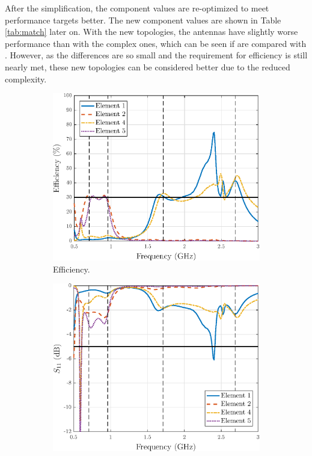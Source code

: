 After the simplification, the component values are re-optimized to meet performance targets better. The new component values are shown in Table \ref{tab:match} later on. With the new topologies, the antennas have slightly worse performance than with the complex ones, which can be seen if  are compared with . However, as the differences are so small and the requirement for efficiency is still nearly met, these new topologies can be considered better due to the reduced complexity.
\begin{figure}[H]
    \centering
    \begin{subfigure}[b]{0.49\textwidth}
        \includegraphics[width=\textwidth]{img/diversity_eff_ideal.eps}
        \caption{Efficiency.}
        \label{fig:div_eff_ideal}
    \end{subfigure}
    \begin{subfigure}[b]{0.49\textwidth}
        \includegraphics[width=\textwidth]{img/diversity_final_match.eps}

\end{subfigure}
\end{figure}
